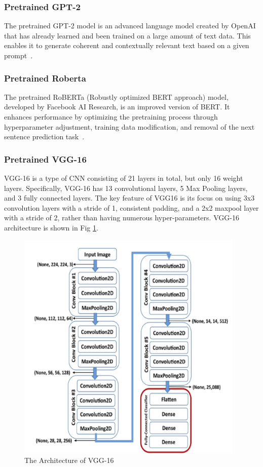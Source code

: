 \documentclass[12pt]{article}
\begin{document}
\subsubsection{Pretrained GPT-2}
 The pretrained GPT-2 model is an advanced language model created by OpenAI that has already learned and been trained on a large amount of text data. This enables it to generate coherent and contextually relevant text based on a given prompt~\cite{solaiman2019release}.
\subsubsection{Pretrained Roberta}
The pretrained RoBERTa (Robustly optimized BERT approach) model, developed by Facebook AI Research, is an improved version of BERT. It enhances performance by optimizing the pretraining process through hyperparameter adjustment, training data modification, and removal of the next sentence prediction task~\cite{liu2019roberta}.
\subsubsection{Pretrained VGG-16}
VGG-16 is a type of CNN consisting of 21 layers in total, but only 16 weight layers. Specifically, VGG-16 has 13 convolutional layers, 5 Max Pooling layers, and 3 fully connected layers. The key feature of VGG16 is its focus on using 3x3 convolution layers with a stride of 1, consistent padding, and a 2x2 maxpool layer with a stride of 2, rather than having numerous hyper-parameters. VGG-16 architecture is shown in Fig \ref{fig:VGG}.
\begin{figure}[H]
    \centering
    \includegraphics[width=0.8\linewidth]{VGG16.png}
    \caption{The Architecture of VGG-16\cite{theckedath2020detecting}}
    \label{fig:VGG}
\end{figure}
\end{document}
